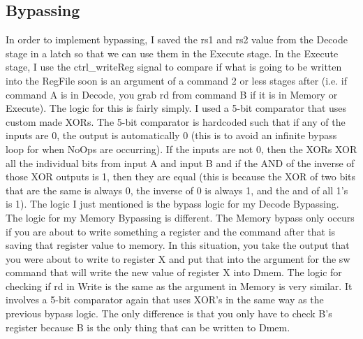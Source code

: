 \documentclass[letterpaper]{article} %
\begin{document}
    \subsection{Bypassing}
        In order to implement bypassing, I saved the rs1 and rs2 value from the Decode stage in a latch so that we can use them in the Execute stage. In the Execute stage, I use the ctrl\_writeReg signal to compare if what is going to be written into the RegFile soon is an argument of a command 2 or less stages after (i.e. if command A is in Decode, you grab rd from command B if it is in Memory or Execute). The logic for this is fairly simply. I used a 5-bit comparator that uses custom made XORs. The 5-bit comparator is hardcoded such that if any of the inputs are 0, the output is automatically 0 (this is to avoid an infinite bypass loop for when NoOps are occurring). If the inputs are not 0, then the XORs XOR all the individual bits from input A and input B and if the AND of the inverse of those XOR outputs is 1, then they are equal (this is because the XOR of two bits that are the same is always 0, the inverse of 0 is always 1, and the and of all 1's is 1). The logic I just mentioned is the bypass logic for my Decode Bypassing. The logic for my Memory Bypassing is different. The Memory bypass only occurs if you are about to write something a register and the command after that is saving that register value to memory. In this situation, you take the output that you were about to write to register X and put that into the argument for the sw command that will write the new value of register X into Dmem. The logic for checking if rd in Write is the same as the argument in Memory is very similar. It involves a 5-bit comparator again that uses XOR's in the same way as the previous bypass logic. The only difference is that you only have to check B's register because B is the only thing that can be written to Dmem. 
        
                       \FloatBarrier
\end{document}
